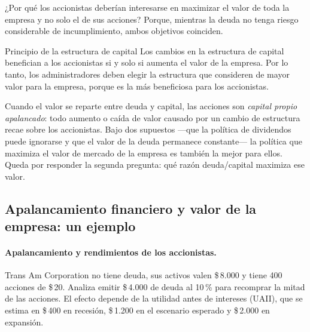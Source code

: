 ¿Por qué los accionistas deberían interesarse en maximizar el valor de toda la empresa y no solo el de sus acciones? Porque, mientras la deuda no tenga riesgo considerable de incumplimiento, ambos objetivos coinciden.

\begin{definicion}{Principio de la estructura de capital}
Los cambios en la estructura de capital benefician a los accionistas si y solo si aumenta el valor de la empresa. Por lo tanto, los administradores deben elegir la estructura que consideren de mayor valor para la empresa, porque es la más beneficiosa para los accionistas.
\end{definicion}

Cuando el valor se reparte entre deuda y capital, las acciones son \emph{capital propio apalancado}: todo aumento o caída de valor causado por un cambio de estructura recae sobre los accionistas. Bajo dos supuestos —que la política de dividendos puede ignorarse y que el valor de la deuda permanece constante— la política que maximiza el valor de mercado de la empresa es también la mejor para ellos. Queda por responder la segunda pregunta: qué razón deuda/capital maximiza ese valor.

\subsection{Apalancamiento financiero y valor de la empresa: un ejemplo}

\paragraph{Apalancamiento y rendimientos de los accionistas.} Trans Am Corporation no tiene deuda, sus activos valen \$\,8.000 y tiene 400 acciones de \$\,20. Analiza emitir \$\,4.000 de deuda al 10\,\% para recomprar la mitad de las acciones. El efecto depende de la utilidad antes de intereses (UAII), que se estima en \$\,400 en recesión, \$\,1.200 en el escenario esperado y \$\,2.000 en expansión.

